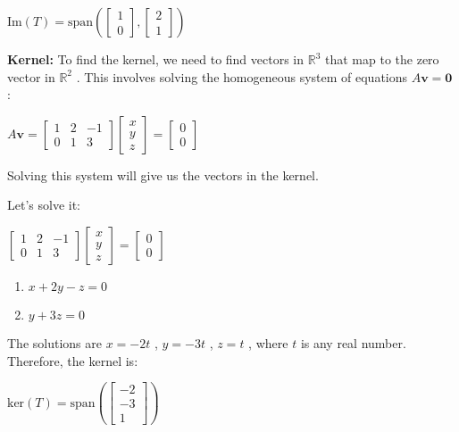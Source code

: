 \documentclass[11pt]{article}
\makeatletter
\providecommand{\tightlist}{%
      \setlength{\itemsep}{0pt}\setlength{\parskip}{0pt}}
\newcommand{\boxspacing}{\kern\kvtcb@left@rule\kern\kvtcb@boxsep}
\newcommand{\prompt}[4]{
        {\ttfamily\llap{{\color{#2}[#3]:\hspace{3pt}#4}}\vspace{-\baselineskip}}
    }
\makeatother
\begin{document}
$  \text{Im}(T) = \text{span}\left(
\begin{bmatrix} 1 \\ 0 \end{bmatrix}
,
\begin{bmatrix} 2 \\ 1 \end{bmatrix}
\right) $ 

\textbf{Kernel:} To find the kernel, we need to find vectors in $ 
\mathbb{R}^3$  that map to the zero vector in $  \mathbb{R}^2$  .
This involves solving the homogeneous system of equations $  A\mathbf{v}
= \mathbf{0}$  :

$  A\mathbf{v} =\begin{bmatrix} 1 & 2 & -1 \\ 0 & 1 & 3 \end{bmatrix} \begin{bmatrix} x \\ y \\ z \end{bmatrix}=\begin{bmatrix} 0 \\ 0 \end{bmatrix}$ 

Solving this system will give us the vectors in the kernel.

Let's solve it:

$ 
\begin{bmatrix} 1 & 2 & -1 \\ 0 & 1 & 3 \end{bmatrix} \begin{bmatrix} x \\ y \\ z \end{bmatrix}=\begin{bmatrix} 0 \\ 0 \end{bmatrix}$ 

\begin{enumerate}
\def\labelenumi{\arabic{enumi}.}
\tightlist
\item
  $  x + 2y - z = 0$ 
\item
  $  y + 3z = 0$ 
\end{enumerate}

The solutions are $  x = -2t$  , $  y = -3t$  , $  z = t$  , where $ 
t$  is any real number. Therefore, the kernel is:

$  \text{ker}(T) = \text{span}\left(\begin{bmatrix} -2 \\ -3 \\ 1 \end{bmatrix}\right) $ 

    \begin{tcolorbox}[breakable, size=fbox, boxrule=1pt, pad at break*=1mm,colback=cellbackground, colframe=cellborder]
\prompt{In}{incolor}{ }{\boxspacing}
\begin{Verbatim}[commandchars=\\\{\}]

\end{Verbatim}
\end{tcolorbox}


    
    
    
\end{document}
